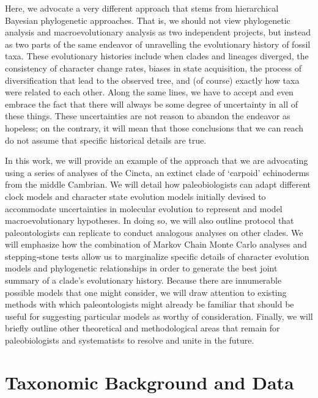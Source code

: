 \documentclass{article}
\begin{document}
Here, we advocate a very different approach that stems from hierarchical Bayesian phylogenetic approaches.  
That is, we should not view phylogenetic analysis and macroevolutionary analysis as two independent projects, but instead as two parts of the same endeavor of unravelling the evolutionary history of fossil taxa.  
These evolutionary histories include when clades and lineages diverged, the consistency of character change rates, biases in state acquisition, the process of diversification that lead to the observed tree, and (of course) exactly how taxa were related to each other.  
Along the same lines, we have to accept and even embrace the fact that there will always be some degree of uncertainty in all of these things.  
These uncertainties are not reason to abandon the endeavor as hopeless; on the contrary, it will mean that those conclusions that we can reach do not assume that specific historical details are true.  

In this work, we will provide an example of the approach that we are advocating using a series of analyses of the Cincta, an extinct clade of `carpoid' echinoderms from the middle Cambrian. 
We will detail how paleobiologists can adapt different clock models and character state evolution models initially devised to accommodate uncertainties in molecular evolution to represent and model macroevolutionary hypotheses.  
In doing so, we will also outline protocol that paleontologists can replicate to conduct analogous analyses on other clades.  
We will emphasize how the combination of Markov Chain Monte Carlo analyses and stepping‑stone tests allow us to marginalize specific details of character evolution models and phylogenetic relationships in order to generate the best joint summary of a clade’s evolutionary history.  
Because there are innumerable possible models that one might consider, we will draw attention to existing methods with which paleontologists might already be familiar that should be useful for suggesting particular models as worthy of consideration.  
Finally, we will briefly outline other theoretical and methodological areas that remain for paleobiologists and systematists to resolve and unite in the future. 

\section{Taxonomic Background and Data}
\end{document}

